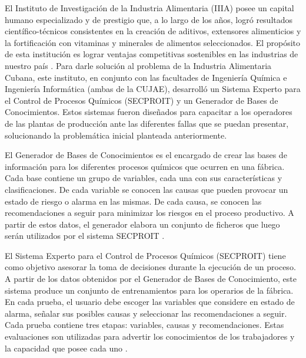 \documentclass[12pt,a4paper]{report}
\begin{document}
El Instituto de Investigación de la Industria Alimentaria (IIIA) posee un capital humano especializado y de prestigio que, a lo largo de los años, logró resultados científico-técnicos consistentes en la creación de aditivos, extensores alimenticios y la fortificación con vitaminas y minerales de alimentos seleccionados. El propósito de esta institución es lograr ventajas competitivas sostenibles en las industrias de nuestro país \citep{anaMailen}.
Para darle solución al problema de la Industria Alimentaria Cubana, este instituto, en conjunto con las facultades de Ingeniería Química e Ingeniería Informática (ambas de la CUJAE), desarrolló un Sistema Experto para el Control de Procesos Químicos (SECPROIT) y un Generador de Bases de Conocimientos. Estos sistemas fueron diseñados para capacitar a los operadores de las plantas de producción ante las diferentes fallas que se puedan presentar, solucionando la problemática inicial planteada anteriormente.

El Generador de Bases de Conocimientos es el encargado de crear las bases de información para los diferentes procesos químicos que ocurren en una fábrica. Cada base contiene un grupo de variables, cada una con sus características y clasificaciones. De cada variable se conocen las causas que pueden provocar un estado de riesgo o alarma en las mismas. De cada causa, se conocen las recomendaciones a seguir para minimizar los riesgos en el proceso productivo. A partir de estos datos, el generador elabora un conjunto de ficheros que luego serán utilizados por el sistema SECPROIT \cite{anaMailen}.

El Sistema Experto para el Control de Procesos Químicos (SECPROIT) tiene como objetivo asesorar la toma de decisiones durante la ejecución de un proceso. A partir de los datos obtenidos por el Generador de Bases de Conocimiento, este sistema produce un conjunto de entrenamientos para los operarios de la fábrica. En cada prueba, el usuario debe escoger las variables que considere en estado de alarma, señalar sus posibles causas y seleccionar las recomendaciones a seguir. Cada prueba contiene tres etapas: variables, causas y recomendaciones. Estas evaluaciones son utilizadas para advertir los conocimientos de los trabajadores y la capacidad que posee cada uno \cite{elena}.
\end{document}
